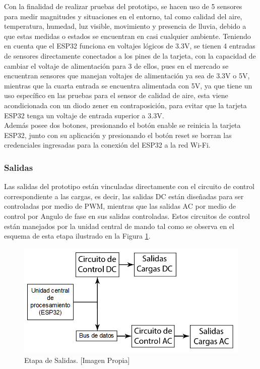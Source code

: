 		Con la finalidad de realizar pruebas del prototipo, se hacen uso de 5 sensores para medir magnitudes y situaciones en el entorno, tal como calidad del aire, temperatura, humedad, luz visible, movimiento y presencia de lluvia, debido a que estas medidas o estados se encuentran en casi cualquier ambiente. Teniendo en cuenta que el ESP32 funciona en voltajes lógicos de 3.3V, se tienen 4 entradas de sensores directamente conectados a los pines de la tarjeta, con la capacidad de cambiar el voltaje de alimentación para 3 de ellos, pues en el mercado se encuentran sensores que manejan voltajes de alimentación ya sea de 3.3V o 5V, mientras que la cuarta entrada se encuentra alimentada con 5V, ya que tiene un uso específico en las pruebas para el sensor de calidad de aire, esta viene acondicionada con un diodo zener en contraposición, para evitar que la tarjeta ESP32 tenga un voltaje de entrada superior a 3.3V.\\

		Además posee dos botones, presionando el botón enable se reinicia la tarjeta ESP32, junto con su aplicación y presionando el botón reset se borran las credenciales ingresadas para la conexión del ESP32 a la red Wi-Fi.\\


	\subsubsection{Salidas}
	
	Las salidas del prototipo están vinculadas directamente con el circuito de control correspondiente a las cargas, es decir, las salidas DC están diseñadas para ser controladas por medio de PWM, mientras que las salidas AC por medio de control por Angulo de fase en sus salidas controladas. Estos circuitos de control están manejados por la unidad central de mando tal como se observa en el esquema de esta etapa ilustrado en la Figura \ref{fig:BSalidas}.\\ 
	
	\begin{figure}[!t]
		\centering
		\caption[Etapa de Salidas.]{Etapa de Salidas. [Imagen Propia]}
		\label{fig:BSalidas}
		\includegraphics[width=0.7\linewidth]{Imagenes/B_Salidas}
	\end{figure}	
	
